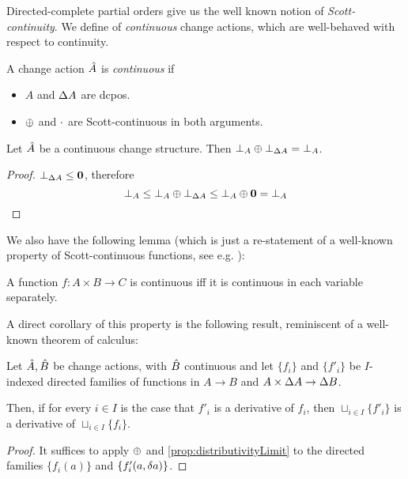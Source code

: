 Directed-complete partial orders give us the well known notion of
\textit{Scott-continuity}. We define of \textit{continuous} change actions,
which are well-behaved with respect to continuity.

\begin{defn}
  A change action $\hat{A}$ is \textit{continuous} if
  \begin{itemize}
    \item $A$ and $\Delta A$ are dcpos.
    \item $\oplus$ and $\cdot$ are Scott-continuous in both arguments.
  \end{itemize}
\end{defn}

\begin{corollary}
  \label{cor:bottomPlusBottom}
  Let $\hat{A}$ be a continuous change structure. Then $\bot_A \oplus
  \bot_{\Delta A} = \bot_A$.
\end{corollary}
\ifproofs
\begin{proof}
  $\bot_{\Delta A} \leq \textbf{0}$, therefore
  $$\bot_A \leq \bot_A \oplus \bot_{\Delta A} \leq \bot_A \oplus \textbf{0} = \bot_A$$
\end{proof}
\fi

We also have the following lemma (which is just a re-statement of a well-known
property of Scott-continuous functions, see e.g. \cite[Lemma~3.2.6]{abramsky1994domain}):

\begin{prop}
  \label{prop:distributivityLimit}
  A function $f : A \times B \rightarrow C$ is continuous iff it is continuous in each variable separately.
\end{prop}

A direct corollary of this property is the following result, reminiscent of a well-known theorem of calculus:

\begin{corollary}
  \label{cor:diffContinuous}
  Let $\hat{A}, \hat{B}$ be change actions, with $\hat{B}$ continuous and let $\{f_i\}$ and $\{f'_i\}$ be
  $I$-indexed directed families of functions in $A \rightarrow B$ and $A \times \Delta A \rightarrow \Delta B$.

  Then, if for every $i \in I$ is the case that $f'_i$ is a derivative of $f_i$, then $\sqcup_{i \in I} \{ f'_i \}$ is
  a derivative of $\sqcup_{i \in I} \{ f_i \}$.
\end{corollary}
\ifproofs
\begin{proof}
  It suffices to apply $\oplus$ and \cref{prop:distributivityLimit} to the directed families $\{ f_i(a) \}$ and
  $\{ f_i'(a, \delta a) \}$.
\end{proof}
\fi

